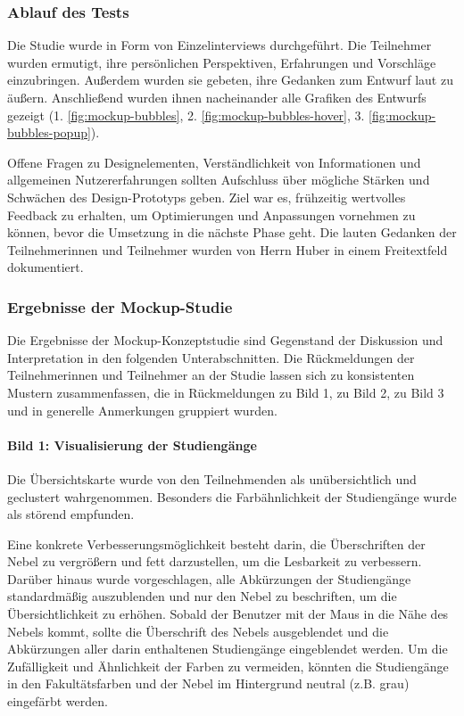 \subsubsection{Ablauf des Tests}
Die Studie wurde in Form von Einzelinterviews durchgeführt. Die Teilnehmer wurden ermutigt, ihre persönlichen Perspektiven, Erfahrungen und Vorschläge einzubringen. Außerdem wurden sie gebeten, ihre Gedanken zum Entwurf laut zu äußern. Anschließend wurden ihnen nacheinander alle Grafiken des Entwurfs gezeigt (1. \autoref{fig:mockup-bubbles},
2. \autoref{fig:mockup-bubbles-hover}, 3. \autoref{fig:mockup-bubbles-popup}). 

Offene Fragen zu Designelementen, Verständlichkeit von Informationen und allgemeinen Nutzererfahrungen sollten Aufschluss über mögliche Stärken und Schwächen des Design-Proto\-typs geben. Ziel war es, frühzeitig wertvolles Feedback zu erhalten, um Optimierungen und Anpassungen vornehmen zu können, bevor die Umsetzung in die nächste Phase geht. Die lauten Gedanken der Teilnehmerinnen und Teilnehmer wurden von Herrn Huber in einem Freitextfeld dokumentiert.

\subsubsection{Ergebnisse der Mockup-Studie}
Die Ergebnisse der Mockup-Konzeptstudie sind Gegenstand der Diskussion und Interpretation in den folgenden Unterabschnitten. Die Rückmeldungen der Teilnehmerinnen und Teilnehmer an der Studie lassen sich zu konsistenten Mustern zusammenfassen, die in Rückmeldungen zu Bild 1, zu Bild 2, zu Bild 3 und in generelle Anmerkungen gruppiert wurden.

\paragraph{Bild 1: Visualisierung der Studiengänge}\label{sec:visualisierung-der-studiengänge}
Die Übersichtskarte wurde von den Teilnehmenden als unübersichtlich und geclustert wahrgenommen. Besonders die Farbähnlichkeit der Studiengänge wurde als störend
empfunden.

Eine konkrete Verbesserungsmöglichkeit besteht darin, die Überschriften der Nebel zu vergrößern und fett darzustellen, um die Lesbarkeit zu verbessern. Darüber hinaus wurde vorgeschlagen, alle Abkürzungen der Studiengänge standardmäßig auszublenden und nur den Nebel zu beschriften, um die Übersichtlichkeit zu erhöhen. Sobald der Benutzer mit der Maus in die Nähe des Nebels kommt, sollte die Überschrift des Nebels ausgeblendet und die Abkürzungen aller darin enthaltenen Studiengänge eingeblendet werden. Um die Zufälligkeit und Ähnlichkeit der Farben zu vermeiden, könnten die Studiengänge in den Fakultätsfarben und der Nebel im Hintergrund neutral (z.B. grau) eingefärbt werden.

